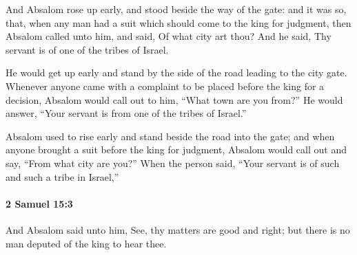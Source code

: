 			\begin{versebox}
					\item[BHS] 
					\item[ASV] And Absalom rose up early, and stood beside the way of the gate: and it was so, that, when any man had a suit which should come to the king for judgment, then Absalom called unto him, and said, Of what city art thou? And he said, Thy servant is of one of the tribes of Israel.
					\item[NIV] He would get up early and stand by the side of the road leading to the city gate. Whenever anyone came with a complaint to be placed before the king for a decision, Absalom would call out to him, “What town are you from?” He would answer, “Your servant is from one of the tribes of Israel.”
					\item[NRSV] Absalom used to rise early and stand beside the road into the gate; and when anyone brought a suit before the king for judgment, Absalom would call out and say, “From what city are you?” When the person said, “Your servant is of such and such a tribe in Israel,”
			\end{versebox}

		\paragraph{2 Samuel 15:3} %
			\label{2SAMUEL-15-3}

			And Absalom said unto him, See, thy matters are good and right; but there is no man deputed of the king to hear thee.

